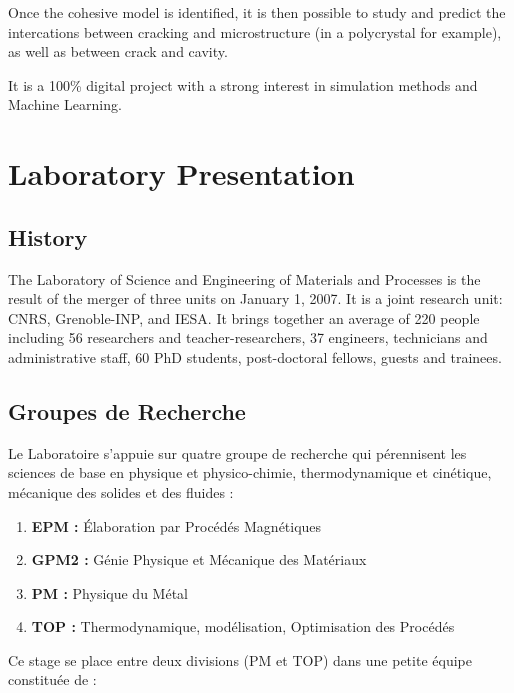     Once the cohesive model is identified, it is then possible to study and predict the intercations between cracking and microstructure (in a polycrystal for example), as well as between crack and cavity. \medskip

    It is a 100\% digital project with a strong interest in simulation methods and Machine Learning.

\section{Laboratory Presentation}

    \subsection{History}

        The Laboratory of Science and Engineering of Materials and Processes is the result of the merger of three units on January 1, 2007. It is a joint research unit: CNRS, Grenoble-INP, and IESA. It brings together an average of 220 people including 56 researchers and teacher-researchers, 37 engineers, technicians and administrative staff, 60 PhD students, post-doctoral fellows, guests and trainees. 

    \subsection{Groupes de Recherche}

        Le Laboratoire s'appuie sur quatre groupe de recherche qui pérennisent les sciences de base en physique et physico-chimie, thermodynamique et cinétique, mécanique des solides et des fluides : 

        \begin{enumerate}[\hspace{3em}$\bullet$]
            \item \textbf{EPM : }Élaboration par Procédés Magnétiques
            \item \textbf{GPM2 : }Génie Physique et Mécanique des Matériaux
            \item \textbf{PM : }Physique du Métal
            \item \textbf{TOP : }Thermodynamique, modélisation, Optimisation des Procédés
        \end{enumerate}
    
        Ce stage se place entre deux divisions (PM et TOP) dans une petite équipe constituée de : 

